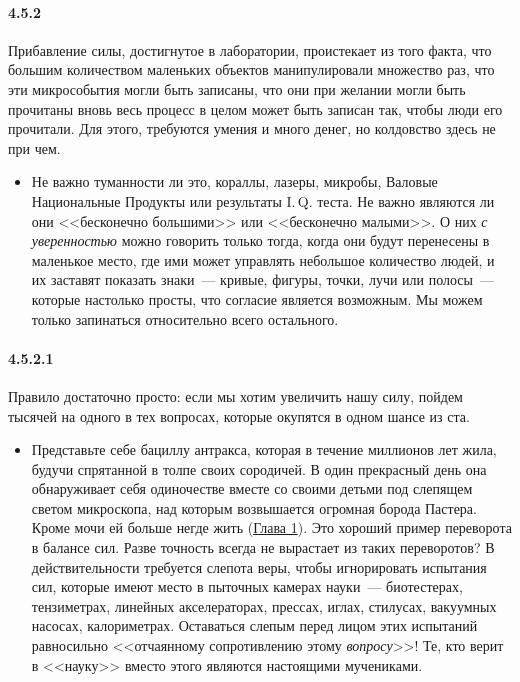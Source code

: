 \paragraph{4.5.2}\hypertarget{par:4.5.2}{} Прибавление силы, достигнутое в лаборатории, проистекает из того факта, что большим количеством маленьких объектов манипулировали множество раз, что эти микрособытия могли быть записаны, что они при желании могли быть прочитаны вновь весь процесс в целом может быть записан так, чтобы люди его прочитали. Для этого, требуются умения и много денег, но колдовство здесь не при чем. 
	\begin{itemize}
	\item 
	Не важно туманности ли это, кораллы, лазеры, микробы, Валовые Национальные Продукты или результаты I.\,Q. теста. Не важно являются ли они <<бесконечно большими>> или <<бесконечно малыми>>. О них {\itshape с уверенностью} можно говорить только тогда, когда они будут перенесены в маленькое место, где ими может управлять небольшое количество людей, и их заставят показать знаки~--- кривые, фигуры, точки, лучи или полосы~--- которые настолько просты, что согласие является возможным. Мы можем только запинаться относительно всего остального.
	\end{itemize}	

\paragraph{4.5.2.1}\hypertarget{par:4.5.2.1}{} Правило достаточно просто: если мы хотим увеличить нашу силу, пойдем тысячей на одного в тех вопросах, которые окупятся в одном шансе из ста. 
	\begin{itemize}
	\item 
	Представьте себе бациллу антракса, которая в течение миллионов лет жила, будучи спрятанной в толпе своих сородичей. В один прекрасный день она обнаруживает себя одиночестве вместе со своими детьми под слепящем светом микроскопа, над которым возвышается огромная борода Пастера. Кроме мочи ей больше негде жить (\hyperlink{chap1}{Глава 1}). Это хороший пример переворота в балансе сил. Разве точность всегда не вырастает из таких переворотов? В действительности требуется слепота веры, чтобы игнорировать испытания сил, которые имеют место в пыточных камерах науки~--- биотестерах, тензиметрах, линейных акселераторах, прессах, иглах, стилусах, вакуумных насосах, калориметрах. Оставаться слепым перед лицом этих испытаний равносильно <<отчаянному сопротивлению этому {\itshape вопросу}>>! Те, кто верит в <<науку>> вместо этого являются настоящими мучениками.
	\end{itemize}	


